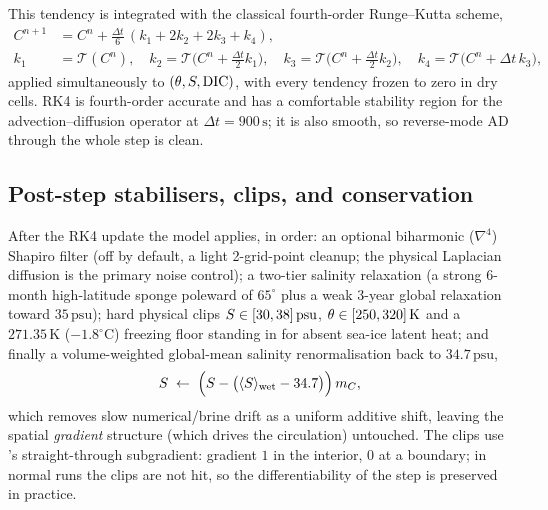 This tendency is integrated with the classical fourth-order Runge--Kutta scheme,
\begin{align}
  C^{n+1} &= C^{n} + \frac{\Delta t}{6}\,(k_1 + 2k_2 + 2k_3 + k_4),\\
  k_1 &= \mathcal{T}(C^n),\quad
  k_2 = \mathcal{T}\!\big(C^n+\tfrac{\Delta t}{2}k_1\big),\quad
  k_3 = \mathcal{T}\!\big(C^n+\tfrac{\Delta t}{2}k_2\big),\quad
  k_4 = \mathcal{T}\!\big(C^n+\Delta t\,k_3\big),
  \label{eq:rk4}
\end{align}
applied simultaneously to $(\theta,S,\mathrm{DIC})$, with every tendency frozen
to zero in dry cells. RK4 is fourth-order accurate and has a comfortable stability
region for the advection--diffusion operator at $\Delta t=900\,\mathrm{s}$; it is
also smooth, so reverse-mode AD through the whole step is clean.

\subsection{Post-step stabilisers, clips, and conservation}

After the RK4 update the model applies, in order: an optional biharmonic
($\nabla^4$) Shapiro filter \citep{shapiro1970} (off by default, a light 2-grid-point cleanup; the
physical Laplacian diffusion is the primary noise control); a two-tier salinity
relaxation (a strong 6-month high-latitude sponge poleward of $65^\circ$ plus a weak
3-year global relaxation toward $35\,\mathrm{psu}$); hard physical clips
$S\in[30,38]\,\mathrm{psu}$, $\theta\in[250,320]\,\mathrm{K}$ and a
$271.35\,\mathrm{K}$ ($-1.8^\circ\mathrm{C}$) freezing floor standing in for absent
sea-ice latent heat; and finally a volume-weighted global-mean salinity
renormalisation back to $34.7\,\mathrm{psu}$,
\begin{equation}
  S \;\leftarrow\; \Big(S - \big(\langle S\rangle_{\mathrm{wet}}
        - 34.7\big)\Big)\,m_C ,
\end{equation}
which removes slow numerical/brine drift as a uniform additive shift, leaving the
spatial \emph{gradient} structure (which drives the circulation) untouched. The
clips use \jax's straight-through subgradient: gradient $1$ in the interior, $0$ at
a boundary; in normal runs the clips are not hit, so the differentiability of the
step is preserved in practice.

